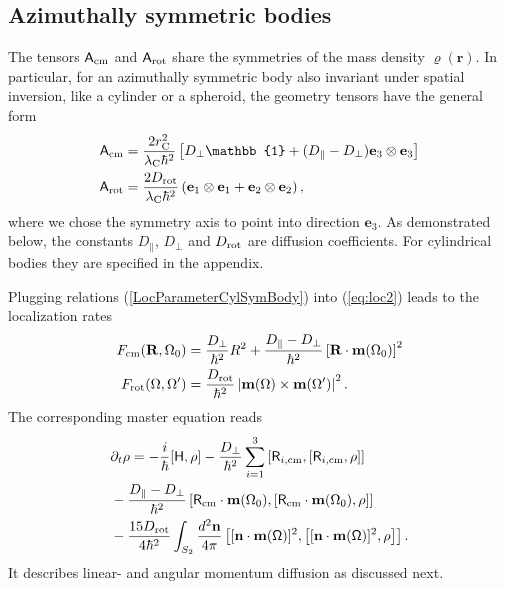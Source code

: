 \documentclass[%
 twocolumn,
 amsmath,amssymb,
 aps,
 pra,
]{revtex4-1}
\newcommand{\op}[1]{{\sf #1}}
\begin{document}
\subsection{Azimuthally symmetric bodies}

The tensors $\op{A}_{\rm cm}$ and $\op{A}_{\rm rot}$ share the symmetries of the mass density $\varrho(\textbf{r})$.  In particular, for an azimuthally symmetric body also invariant under spatial inversion, like a cylinder or a spheroid, the geometry tensors have the general form
\begin{subequations}\label{LocParameterCylSymBody}
\begin{align}
\op{A}_{\rm cm}&= \frac{2 r_{\rm C}^2}{\lambda_{\rm C} \hbar^2} \left [D_{\perp}\mathbb{1}
+(D_{\parallel}-D_{\perp})\textbf{e}_{3}\otimes\textbf{e}_{3} \right ]\\
\op{A}_{\rm rot}&= \frac{2 D_{\rm rot}}{\lambda_{\rm C} \hbar^2} \left ( \textbf{e}_{1}\otimes\textbf{e}_{1} + \textbf{e}_{2}\otimes\textbf{e}_{2}\right ),
\end{align}
\end{subequations}
where we chose the symmetry axis to point into direction $\textbf{e}_3$. As demonstrated below, the constants $D_\|$, $D_\perp$ and $D_{\rm rot}$ are diffusion coefficients. For cylindrical bodies they are specified in the appendix. 

Plugging relations (\ref{LocParameterCylSymBody}) into (\ref{eq:loc2}) leads to the localization rates  
\begin{subequations} \label{eq:loc3}
\begin{align}
F_{\rm cm}({\bf R},\Omega_0) & = \frac{D_\bot}{\hbar^2} R^2 + \frac{ D_\| - D_\bot}{\hbar^2} \left [\textbf{R} \cdot \textbf{m}(\Omega_0)\right ]^2\\
F_{\rm rot}(\Omega,\Omega')& =\frac{D_{\rm rot}}{\hbar^2} \left | \textbf{m}(\Omega)\times\textbf{m}(\Omega') \right |^2.
\end{align}
\end{subequations}
The corresponding master equation reads
\begin{align}
&\partial_t  \rho =  -\frac{i}{\hbar} [\op{H},\rho] -\frac{D_\perp}{\hbar^2} \sum_{i = 1}^3 \left [ \op{R}_{i,\rm cm} , \left  [\op{R}_{i, \rm cm}, \rho \right ] \right] \notag \\
& - \frac{D_\| - D_\perp}{\hbar^2} \left [ \op{R}_{\rm cm} \cdot {\bf m}(\Omega_0),\left[\op{R}_{\rm cm} \cdot {\bf m}(\Omega_0),\rho \right ] \right ] \notag \\
& -  \frac{15 D_{\rm rot}}{4\hbar^2} \int_{S_2} \frac{d^2 \textbf{n}}{4 \pi} \left [  [\textbf{n} \cdot \textbf{m}(\op{\Omega})]^2 , \left [ [\textbf{n} \cdot \textbf{m}(\op{\Omega})]^2, \rho \right ] \right ]. 
 \label{eq:MeqDiffLim}
\end{align}
It describes linear- and angular momentum diffusion \cite{stickler2016spatio} as discussed next.
\end{document}
